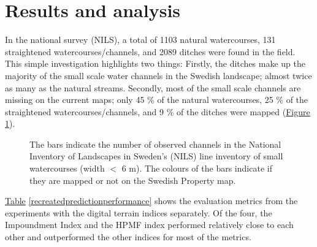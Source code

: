 \documentclass[11pt, review]{elsarticle} %
\begin{document}
\section{Results and analysis}
In the national survey (NILS), a total of 1103 natural watercourses, 131 straightened watercourses/channels, and 2089 ditches were found in the field. This simple investigation highlights two things: Firstly, the ditches make up the majority of the small scale water channels in the Swedish landscape; almost twice as many as the natural streams. Secondly, most of the small scale channels are missing on the current maps; only 45 \% of the natural watercourses, 25 \% of the straightened watercourses/channels, and 9 \% of the ditches were mapped (\hyperref[fig:watercoursebarplot]{Figure} \ref{fig:watercoursebarplot}).

\begin{figure}[H]
    \centering
    \caption{The bars indicate the number of observed channels in the National Inventory of Landscapes in Sweden's (NILS) line inventory of small watercourses (width $<$ 6 m). The colours of the bars indicate if they are mapped or not on the Swedish Property map.}
    \label{fig:watercoursebarplot}
\end{figure}

\hyperref[recreatedpredictionperformance]{Table} \ref{recreatedpredictionperformance} shows the evaluation metrics from the experiments with the digital terrain indices separately. Of the four, the Impoundment Index and the HPMF index performed relatively close to each other and outperformed the other indices for most of the metrics.
\end{document}
